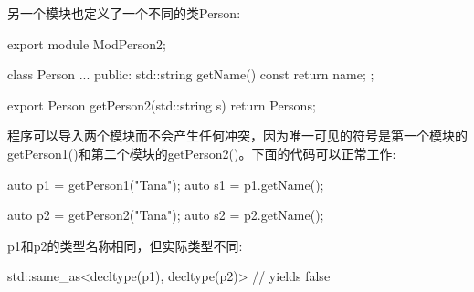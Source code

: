 另一个模块也定义了一个不同的类Person:

\begin{cpp}
export module ModPerson2;

class Person {
	...
	public:
	std::string getName() const {
		return name;
	}
};

export Person getPerson2(std::string s) {
	return Person{s};
}
\end{cpp}

程序可以导入两个模块而不会产生任何冲突，因为唯一可见的符号是第一个模块的getPerson1()和第二个模块的getPerson2()。下面的代码可以正常工作:

\begin{cpp}
auto p1 = getPerson1("Tana");
auto s1 = p1.getName();

auto p2 = getPerson2("Tana");
auto s2 = p2.getName();
\end{cpp}

p1和p2的类型名称相同，但实际类型不同:

\begin{cpp}
std::same_as<decltype(p1), decltype(p2)> // yields false
\end{cpp}











